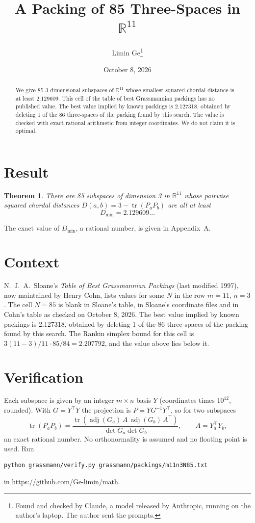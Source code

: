 \documentclass[11pt,a4paper]{article}
\title{A Packing of 85 Three-Spaces in $\mathbb{R}^{11}$}
\author{Limin Ge\thanks{Found and checked by Claude, a model released by Anthropic, running on the author's laptop. The author sent the prompts.}}
\date{October 8, 2026}
\newtheorem*{theorem}{Theorem}
\begin{document}
\maketitle
\begin{abstract}
We give 85 3-dimensional subspaces of $\mathbb{R}^{11}$ whose smallest squared chordal distance is at least 2.129609. This cell of the table of best Grassmannian packings has no published value. The best value implied by known packings is 2.127318, obtained by deleting 1 of the 86 three-spaces of the packing found by this search. The value is checked with exact rational arithmetic from integer coordinates. We do not claim it is optimal.
\end{abstract}

\section{Result}
\begin{theorem}
There are 85 subspaces of dimension 3 in $\mathbb{R}^{11}$ whose pairwise squared chordal distances $D(a,b) = 3 - \operatorname{tr}(P_aP_b)$ are all at least
\[ D_{\min} = 2.129609\ldots \]
\end{theorem}
The exact value of $D_{\min}$, a rational number, is given in Appendix~A.


\section{Context}
N.~J.~A.~Sloane's \emph{Table of Best Grassmannian Packings} (last modified 1997), now maintained by Henry Cohn, lists values for some $N$ in the row $m=11$, $n=3$. The cell $N=85$ is blank in Sloane's table, in Sloane's coordinate files and in Cohn's table as checked on October 8, 2026. The best value implied by known packings is 2.127318, obtained by deleting 1 of the 86 three-spaces of the packing found by this search. The Rankin simplex bound for this cell is $3(11-3)/11\cdot 85/84 = 2.207792$, and the value above lies below it.


\section{Verification}
Each subspace is given by an integer $m\times n$ basis $Y$ (coordinates times $10^{12}$, rounded). With $G=Y^\top Y$ the projection is $P=YG^{-1}Y^\top$, so for two subspaces
\[ \operatorname{tr}(P_aP_b)=\frac{\operatorname{tr}(\operatorname{adj}(G_a)\,A\,\operatorname{adj}(G_b)\,A^\top)}{\det G_a\det G_b},\qquad A=Y_a^\top Y_b, \]
an exact rational number. No orthonormality is assumed and no floating point is used. Run
\begin{verbatim}
python grassmann/verify.py grassmann/packings/m11n3N85.txt
\end{verbatim}
in \url{https://github.com/Ge-limin/math}.
\end{document}
